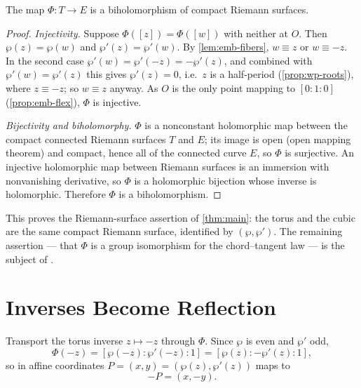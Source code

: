 \begin{theorem}
\label{thm:emb-iso}
The map \(\Phi : T \to E\) is a biholomorphism of compact Riemann surfaces.
\end{theorem}

\begin{proof}
\emph{Injectivity.} Suppose \(\Phi([z]) = \Phi([w])\) with neither at \(O\). Then
\(\wp(z) = \wp(w)\) and \(\wp'(z) = \wp'(w)\). By \cref{lem:emb-fibers},
\(w \equiv z\) or \(w \equiv -z\). In the second case \(\wp'(w) = \wp'(-z) =
-\wp'(z)\), and combined with \(\wp'(w) = \wp'(z)\) this gives \(\wp'(z) = 0\),
i.e.\ \(z\) is a half-period (\cref{prop:wp-roots}), where \(z \equiv -z\); so
\(w \equiv z\) anyway. As \(O\) is the only point mapping to \([0:1:0]\)
(\cref{prop:emb-flex}), \(\Phi\) is injective.

\emph{Bijectivity and biholomorphy.} \(\Phi\) is a nonconstant holomorphic map
between the compact connected Riemann surfaces \(T\) and \(E\); its image is open
(open mapping theorem) and compact, hence all of the connected curve \(E\), so
\(\Phi\) is surjective. An injective holomorphic map between Riemann surfaces is
an immersion with nonvanishing derivative, so \(\Phi\) is a holomorphic bijection
whose inverse is holomorphic. Therefore \(\Phi\) is a biholomorphism.
\end{proof}

This proves the Riemann-surface assertion of \cref{thm:main}: the torus and the
cubic are the same compact Riemann surface, identified by \((\wp, \wp')\). The
remaining assertion --- that \(\Phi\) is a group isomorphism for the chord--tangent
law --- is the subject of .

\section{Inverses Become Reflection}
\label{sec:emb-reflection}

Transport the torus inverse \(z \mapsto -z\) through \(\Phi\). Since \(\wp\) is
even and \(\wp'\) odd,
\[
  \Phi(-z) = [\wp(-z) : \wp'(-z) : 1] = [\wp(z) : -\wp'(z) : 1],
\]
so in affine coordinates \(P = (x, y) = (\wp(z), \wp'(z))\) maps to
\[
  -P = (x, -y) .
\]

